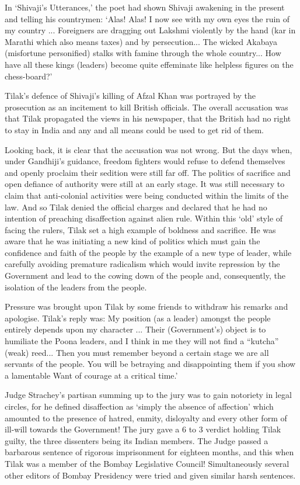 In `Shivaji's Utterances,' the poet had shown Shivaji awakening in the present and telling his countrymen: `Alas! Alas! I now see with my own eyes the ruin of my country ... Foreigners are dragging out Lakshmi violently by the hand (kar in Marathi which also means taxes) and by persecution... The wicked Akabaya (misfortune personified) stalks with famine through the whole country... How have all these kings (leaders) become quite effeminate like helpless figures on the chess-board?'

Tilak's defence of Shivaji's killing of Afzal Khan was portrayed by the prosecution as an incitement to kill British officials. The overall accusation was that Tilak propagated the views in his newspaper, that the British had no right to stay in India and any and all means could be used to get rid of them.

Looking back, it is clear that the accusation was not wrong. But the days when, under Gandhiji's guidance, freedom fighters would refuse to defend themselves and openly proclaim their sedition were still far off. The politics of sacrifice and open defiance of authority were still at an early stage. It was still necessary to claim that anti-colonial activities were being conducted within the limits of the law. And so Tilak denied the official charges and declared that he had no intention of preaching disaffection against alien rule. Within this `old' style of facing the rulers, Tilak set a high example of boldness and sacrifice. He was aware that he was initiating a new kind of politics which must gain the confidence and faith of the people by the example of a new type of leader, while carefully avoiding premature radicalism which would invite repression by the Government and lead to the cowing down of the people and, consequently, the isolation of the leaders from the people.

Pressure was brought upon Tilak by some friends to withdraw his remarks and apologise. Tilak's reply was: My position (as a leader) amongst the people entirely depends upon my character ... Their (Government's) object is to humiliate the Poona leaders, and I think in me they will not find a ``kutcha'' (weak) reed... Then you must remember beyond a certain stage we are all servants of the people. You will be betraying and disappointing them if you show a lamentable Want of courage at a critical time.'

Judge Strachey's partisan summing up to the jury was to gain notoriety in legal circles, for he defined disaffection as `simply the absence of affection' which amounted to the presence of hatred, enmity, disloyalty and every other form of ill-will towards the Government! The jury gave a 6 to 3 verdict holding Tilak guilty, the three dissenters being its Indian members. The Judge passed a barbarous sentence of rigorous imprisonment for eighteen months, and this when Tilak was a member of the Bombay Legislative Council! Simultaneously several other editors of Bombay Presidency were tried and given similar harsh sentences.

